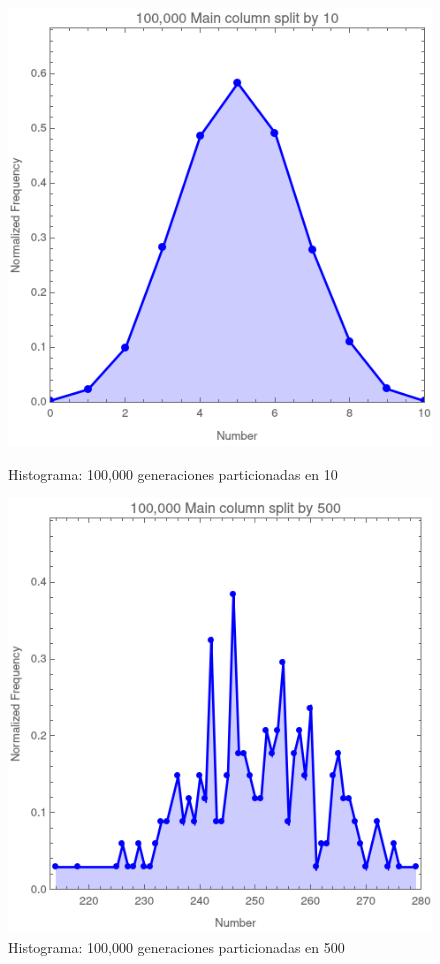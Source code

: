 \documentclass[12pt,twoside]{article}
\begin{document}
	\begin{figure}[H]
		\centering
		\begin{minipage}{0.45\textwidth}
			\centering
			\includegraphics[width=\textwidth]{img/test_1_10.png}
			\caption{Histograma: 100,000 generaciones particionadas en 10}
			\label{img:test1_10}
		\end{minipage}
		\hfill
		\begin{minipage}{0.45\textwidth}
			\centering
			\includegraphics[width=\textwidth]{img/test_1_500.png}
			\caption{Histograma: 100,000 generaciones particionadas en 500}
			\label{img:test1_500}
		\end{minipage}
	\end{figure}
\end{document}
